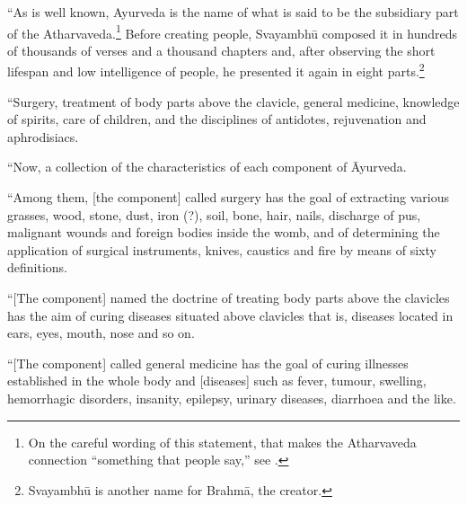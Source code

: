 \begin{translation}
“As is well known, Ayurveda is the name of what is said to be the
subsidiary part of the Atharvaveda.\footnote{On the careful wording
    of this statement, that makes the Atharvaveda connection “something
    that people say,” see \cite[400--401]{wuja-2022}.} Before creating
    people, Svayambhū composed it in hundreds of thousands of verses and
    a thousand chapters and, after observing the short lifespan and low
    intelligence of people, he presented it again in eight
    parts.\footnote{Svayambhū is another name for Brahmā, the creator.}
    
    \item[7] “Surgery, treatment of body parts above the clavicle, general medicine, 
    knowledge of spirits, care of children, and the disciplines of antidotes, rejuvenation 
    and aphrodisiacs.
    
    \item[8.1] 
    
“Now,  a collection of the characteristics of each component of
Āyurveda.
    
    \item[8.1a] 
    
“Among them, [the component] called surgery has the goal of
extracting various grasses, wood, stone, dust, iron (?), soil, bone,
hair, nails, discharge of pus, malignant wounds and foreign bodies
inside the womb, and of determining the application of surgical
instruments, knives, caustics and fire by means of sixty definitions.
    
    \item[8.2] “[The component] named the doctrine of treating body parts 
    above 
    the clavicles has the aim of curing diseases situated above clavicles that is,  
    diseases located in ears, eyes, mouth, nose and so on.
    
    \item[8.3] “[The component] called general medicine has the goal of curing 
    illnesses established in the whole body and [diseases] such as fever, tumour, 
    swelling, hemorrhagic disorders, insanity, epilepsy, urinary diseases, diarrhoea 
    and the like.
    

\end{translation}
